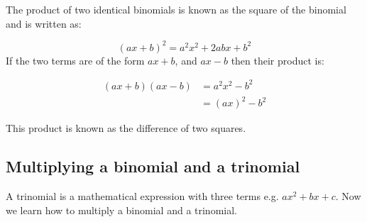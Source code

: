 The product of two identical binomials is known as the square of the binomial and is written as:

\begin{equation*}
{(ax+b)}^{2}={a}^{2}{x}^{2}+2abx+{b}^{2}
\end{equation*}
If the two terms are of the form $ax+b$, and $ax-b$ then their product is:\par 

\begin{align*}
(ax+b)(ax-b) &={a}^{2}{x}^{2}-{b}^{2} \\ &= (ax)^2-b^2
\end{align*}

This product is known as the difference of two squares.\par 


\subsection*{Multiplying a binomial and a trinomial}







\addtocounter{footnote}{-0}

A trinomial is a mathematical expression with three terms e.g. $ax^{2} + bx + c$.
Now we learn how to multiply a binomial and a
trinomial.\par 


